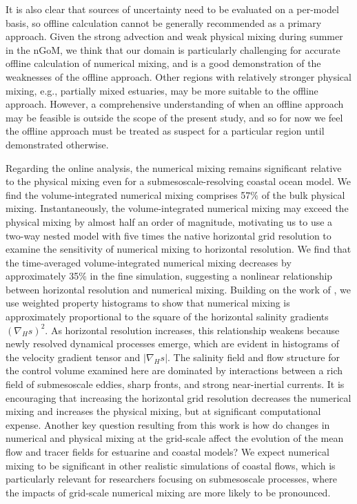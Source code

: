 It is also clear that sources of uncertainty need to be evaluated on a per-model basis, so offline calculation cannot be generally recommended as a primary approach. Given the strong advection and weak physical mixing during summer in the nGoM, we think that our domain is particularly challenging for accurate offline calculation of numerical mixing, and is a good demonstration of the weaknesses of the offline approach. Other regions with relatively stronger physical mixing, e.g., partially mixed estuaries, may be more suitable to the offline approach. However,  a comprehensive understanding of when an offline approach may be feasible is outside the scope of the present study, and so for now we feel the offline approach must be treated as suspect for a particular region until demonstrated otherwise.

Regarding the online analysis, the numerical mixing remains significant relative to the physical mixing even for a submesoscale-resolving coastal ocean model. We find the volume-integrated numerical mixing comprises 57$\%$ of the bulk physical mixing. Instantaneously, the volume-integrated numerical mixing may exceed the physical mixing by almost half an order of magnitude, motivating us to use a two-way nested model with five times the native horizontal grid resolution to examine the sensitivity of numerical mixing to horizontal resolution. We find that the time-averaged volume-integrated numerical mixing decreases by approximately 35$\%$ in the fine simulation, suggesting a nonlinear relationship between horizontal resolution and numerical mixing. Building on the work of \citet{Wang_2021}, we use weighted property histograms to show that numerical mixing is approximately proportional to the square of the horizontal salinity gradients $(\nabla_H s)^2$. As horizontal resolution increases, this relationship weakens because newly resolved dynamical processes emerge, which are evident in histograms of the velocity gradient tensor and $|\nabla_H s|$.  
The salinity field and flow structure for the control volume examined here are dominated by interactions between a rich field of submesoscale eddies, sharp fronts, and strong near-inertial currents. It is encouraging that increasing the horizontal grid resolution decreases the numerical mixing and increases the physical mixing, but at significant computational expense. Another key question resulting from this work is how do changes in numerical and physical mixing at the grid-scale affect the evolution of the mean flow and tracer fields for estuarine and coastal models? We expect numerical mixing to be significant in other realistic simulations of coastal flows, which is particularly relevant for researchers focusing on submesoscale processes, where the impacts of grid-scale numerical mixing are more likely to be pronounced.

